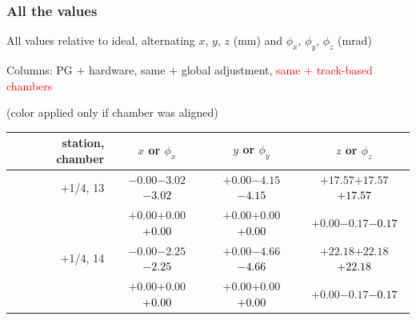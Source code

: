 \documentclass[compress]{beamer}
\begin{document}
\begin{frame}
\frametitle{All the values}
\tiny

All values relative to ideal, alternating $x$, $y$, $z$ (mm) and $\phi_x$, $\phi_y$, $\phi_z$ (mrad)

Columns: PG $+$ hardware, same $+$ global adjustment, \textcolor{red}{same $+$ track-based chambers}

\hfill (color applied only if chamber was aligned)

\vfill
\renewcommand{\arraystretch}{1.1}
\begin{tabular}{r | c | c | c}
station, chamber & $x$ or $\phi_x$ & $y$ or $\phi_y$ & $z$ or $\phi_z$ \\\hline
$+$1/4, 13 & $-0.00$\hspace{0.1 cm}$-3.02$\hspace{0.1 cm}\textcolor{black}{$-3.02$} & $+0.00$\hspace{0.1 cm}$-4.15$\hspace{0.1 cm}\textcolor{black}{$-4.15$} & $+17.57$\hspace{0.1 cm}$+17.57$\hspace{0.1 cm}\textcolor{black}{$+17.57$} \\
           & $+0.00$\hspace{0.1 cm}$+0.00$\hspace{0.1 cm}\textcolor{black}{$+0.00$} & $+0.00$\hspace{0.1 cm}$+0.00$\hspace{0.1 cm}\textcolor{black}{$+0.00$} & $+0.00$\hspace{0.1 cm}$-0.17$\hspace{0.1 cm}\textcolor{black}{$-0.17$} \\
$+$1/4, 14 & $-0.00$\hspace{0.1 cm}$-2.25$\hspace{0.1 cm}\textcolor{black}{$-2.25$} & $+0.00$\hspace{0.1 cm}$-4.66$\hspace{0.1 cm}\textcolor{black}{$-4.66$} & $+22.18$\hspace{0.1 cm}$+22.18$\hspace{0.1 cm}\textcolor{black}{$+22.18$} \\
           & $+0.00$\hspace{0.1 cm}$+0.00$\hspace{0.1 cm}\textcolor{black}{$+0.00$} & $+0.00$\hspace{0.1 cm}$+0.00$\hspace{0.1 cm}\textcolor{black}{$+0.00$} & $+0.00$\hspace{0.1 cm}$-0.17$\hspace{0.1 cm}\textcolor{black}{$-0.17$} \\

\end{tabular}
\end{frame}
\end{document}
